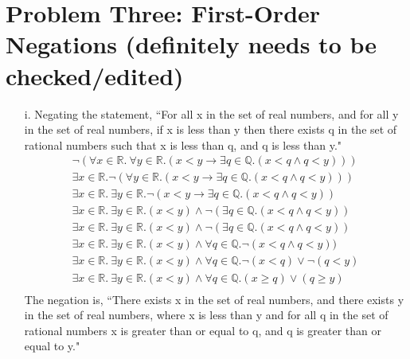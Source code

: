 \documentclass[10pt,letter]{article}
\begin{document}
\section*{Problem Three: First-Order Negations (definitely needs to be checked/edited)}

\begin{enumerate}
\item[i.] Negating the statement, ``For all x in the set of real numbers, and for all y in the set of real numbers, if x is less than y then there exists q in the set of rational numbers such that x is less than q, and q is less than y."
\begin{gather}
\neg(\forall x \in \mathbb{R}.\ \forall y \in \mathbb{R}. (x < y \rightarrow \exists q \in \mathbb{Q}. (x < q \wedge q < y)))\\
\exists x \in \mathbb{R}. \neg (\forall y \in \mathbb{R}. (x < y \rightarrow \exists q \in \mathbb{Q}. (x < q \wedge q < y)))\\
\exists x \in \mathbb{R}.\ \exists y \in \mathbb{R}. \neg(x < y \rightarrow \exists q \in \mathbb{Q}. (x < q \wedge q < y))\\
\exists x \in \mathbb{R}.\ \exists y \in \mathbb{R}. (x < y) \wedge \neg(\exists q \in \mathbb{Q}. (x < q \wedge q < y))\\
\exists x \in \mathbb{R}.\ \exists y \in \mathbb{R}. (x < y) \wedge \neg(\exists q \in \mathbb{Q}. (x < q \wedge q < y))\\
\exists x \in \mathbb{R}.\ \exists y \in \mathbb{R}. (x < y) \wedge \forall q \in \mathbb{Q}. \neg(x < q \wedge q < y))\\
\exists x \in \mathbb{R}.\ \exists y \in \mathbb{R}. (x < y) \wedge \forall q \in \mathbb{Q}. \neg(x < q) \vee \neg(q < y)\\
\exists x \in \mathbb{R}.\ \exists y \in \mathbb{R}. (x < y) \wedge \forall q \in \mathbb{Q}. (x \geq q) \vee (q \geq y)\\
\end{gather}
The negation is, ``There exists x in the set of real numbers, and there exists y in the set of real numbers, where x is less than y and for all q in the set of rational numbers x is greater than or equal to q, and q is greater than or equal to y."\\


\end{enumerate}
\end{document}
